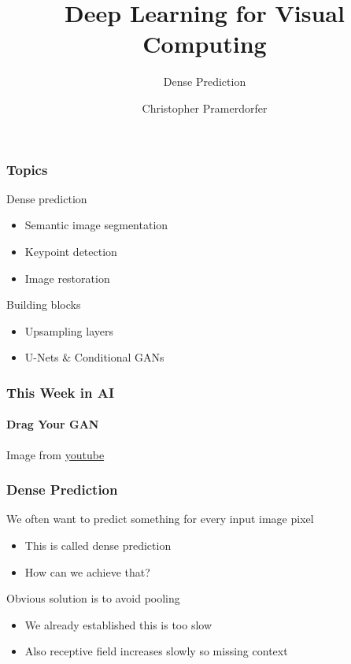 \documentclass[xetex,professionalfont]{beamer}
\title{Deep Learning for Visual Computing}
\subtitle{Dense Prediction}
\author{Christopher Pramerdorfer}
\institute{Computer Vision Lab, TU Wien}
\renewcommand\emph[1]{\textcolor{tuwcvl_cvl_blue}{#1}}
\begin{document}
\begin{frame}
	\maketitle
\end{frame}


\begin{frame}
	\frametitle{Topics}

	Dense prediction
	\begin{itemize}
		\item Semantic image segmentation
		\item Keypoint detection
		\item Image restoration
	\end{itemize}

	\bigskip

	Building blocks
	\begin{itemize}
		\item Upsampling layers
		\item U-Nets \& Conditional GANs
	\end{itemize}

\end{frame}


\begin{frame}
	\frametitle{This Week in AI}
	\framesubtitle{Drag Your GAN}

	\begin{center}
		{\centering Image from \href{https://www.youtube.com/watch?v=BPSv6veX1HA}{youtube}}
	\end{center}

\end{frame}


\begin{frame}
	\frametitle{Dense Prediction}

	We often want to predict something for every input image pixel
	\begin{itemize}
		\item This is called \emph{dense prediction}
		\item How can we achieve that?
	\end{itemize}

	\bigskip

	Obvious solution is to avoid pooling
	\begin{itemize}
		\item We already established this is too slow
		\item Also receptive field increases slowly so missing context %
	\end{itemize}

\end{frame}
\end{document}
